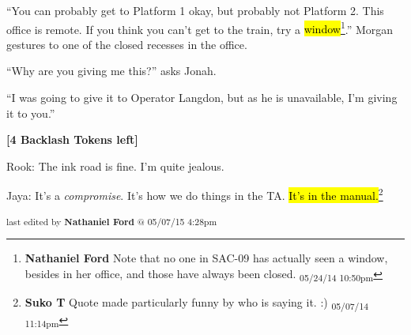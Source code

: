 ``You can probably get to Platform 1 okay, but probably not Platform 2.  This office is remote.  If you think you can't get to the train, try a \hl{window}\footnote{\textbf{Nathaniel Ford }Note that no one in SAC-09 has actually seen a window, besides in her office, and those have always been closed. \textsubscript{05/24/14 10:50pm}}.'' Morgan gestures to one of the closed recesses in the office. 

``Why are you giving me this?'' asks Jonah.

``I was going to give it to Operator Langdon, but as he is unavailable, I'm giving it to you.''





\textbf{{[}4 Backlash Tokens left{]}}










Rook: The ink road is fine.  I'm quite jealous.




Jaya: It's a \textit{compromise}.  It's how we do things in the TA.  \hl{It's in the manual.}\footnote{\textbf{Suko T }Quote made particularly funny by who is saying it. :) \textsubscript{05/07/14 11:14pm}}






\vspace{\fill}

\begin{flushright}
\textsubscript{last edited by \textbf{Nathaniel Ford} @ 05/07/15 4:28pm}
\end{flushright}

